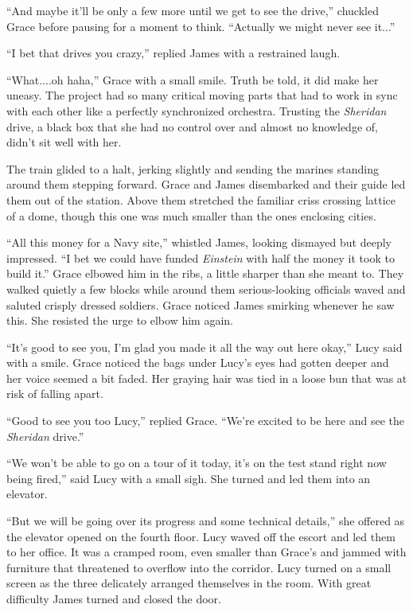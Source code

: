 \documentclass[openany, 12pt]{book} %
\begin{document}
``And maybe it'll be only a few more until we get to see the drive,'' chuckled Grace before pausing for a moment to think. ``Actually we might never see it...''

``I bet that drives you crazy,'' replied James with a restrained laugh.

``What....oh haha,'' Grace with a small smile. Truth be told, it did make her uneasy. The project had so many critical moving parts that had to work in sync with each other like a perfectly synchronized orchestra. Trusting the \textit{Sheridan} drive, a black box that she had no control over and almost no knowledge of, didn't sit well with her. 

The train glided to a halt, jerking slightly and sending the marines standing around them stepping forward. Grace and James disembarked and their guide led them out of the station. Above them stretched the familiar criss crossing lattice of a dome, though this one was much smaller than the ones enclosing cities. 

``All this money for a Navy site,'' whistled James, looking dismayed but deeply impressed. ``I bet we could have funded \textit{Einstein} with half the money it took to build it.'' Grace elbowed him in the ribs, a little sharper than she meant to. They walked quietly a few blocks while around them serious-looking officials waved and saluted crisply dressed soldiers. Grace noticed James smirking whenever he saw this. She resisted the urge to elbow him again.

``It's good to see you, I'm glad you made it all the way out here okay,'' Lucy said with a smile. Grace noticed the bags under Lucy's eyes had gotten deeper and her voice seemed a bit faded. Her graying hair was tied in a loose bun that was at risk of falling apart.

``Good to see you too Lucy,'' replied Grace. ``We're excited to be here and see the \textit{Sheridan} drive.''

``We won't be able to go on a tour of it today, it's on the test stand right now being fired,'' said Lucy with a small sigh. She turned and led them into an elevator.

``But we will be going over its progress and some technical details,'' she offered as the elevator opened on the fourth floor. Lucy waved off the escort and led them to her office. It was a cramped room, even smaller than Grace's and jammed with furniture that threatened to overflow into the corridor. Lucy turned on a small screen as the three delicately arranged themselves in the room. With great difficulty James turned and closed the door.
\end{document}
